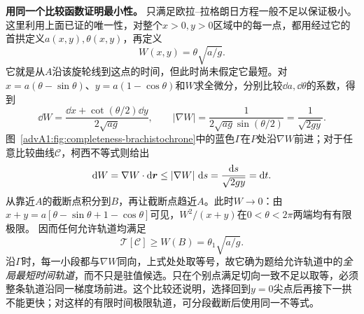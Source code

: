\textbf{用同一个比较函数证明最小性。}
只满足欧拉--拉格朗日方程一般不足以保证极小。这里利用上面已证的唯一性，对整个$x>0,y>0$区域中的每一点，都用经过它的首拱定义$a(x,y),\theta(x,y)$，再定义
\[
 W(x,y)=\theta\sqrt{a/g}.
\]
它就是从$A$沿该旋轮线到这点的时间，但此时尚未假定它最短。对$x=a(\theta-\sin\theta)$、$y=a(1-\cos\theta)$和$W$求全微分，分别比较$\dd a,\dd\theta$的系数，得到
\[
 \dd W=\frac{\dd x+\cot(\theta/2)\dd y}{2\sqrt{ag}},\qquad
 |\nabla W|=\frac1{2\sqrt{ag}\sin(\theta/2)}=\frac1{\sqrt{2gy}}.
\]
图~\ref{advA1:fig:completeness-brachistochrone}中的蓝色$\Gamma$在$P$处沿$\nabla W$前进；对于任意比较曲线$\mathcal C$，柯西不等式则给出
\[
 \mathop{}\!\mathrm d W=\nabla W\cdot\mathop{}\!\mathrm d\bm{r}
 \le|\nabla W|\,\mathop{}\!\mathrm d s=\frac{\mathop{}\!\mathrm d s}{\sqrt{2gy}}=\mathop{}\!\mathrm d t.
\]
从靠近$A$的截断点积分到$B$，再让截断点趋近$A$。此时$W\to0$：由
$x+y=a[\theta-\sin\theta+1-\cos\theta]$可见，$W^2/(x+y)$在$0<\theta<2\pi$两端均有有限极限。
因而任何允许轨道均满足
\[
 \mathcal T[\mathcal C]\ge W(B)=\theta_1\sqrt{a/g}.
\]
沿$\Gamma$时，每一小段都与$\nabla W$同向，上式处处取等号，故它确为题给允许轨道中的\emph{全局最短时间轨道}，而不只是驻值候选。只在个别点满足切向一致不足以取等，必须整条轨道沿同一梯度场前进。这个比较还说明，选择回到$y=0$尖点后再接下一拱不能更快；对这样的有限时间极限轨道，可分段截断后使用同一不等式。

